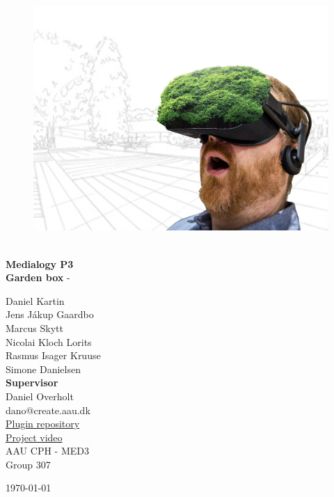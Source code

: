 \begin{titlepage}
			
\addtolength{\voffset}{2cm}

\begin{figure}[H]
\centering
\vspace{2cm}	%
\includegraphics[width=0.99\linewidth]{figure/Frontpage/gardenposterCropped.png}
\end{figure}

\mbox{}
\vfill
\renewcommand{\familydefault}{\sfdefault} \normalfont %
\HRule\\[0.1cm]
\textbf{{\small Medialogy P3\\ {\Huge Garden box}}} \hspace{0.15cm} {\Huge \color{gray}-} \\
\HRule\smallskip{}
\begin{multicols}{2}
{\Large Daniel Kartin\\Jens Jákup Gaardbo\\Marcus Skytt\\Nicolai Kloch Lorits\\Rasmus Isager Kruuse\\Simone Danielsen\columnbreak}\\
\setlength{\parskip}{2.4cm}
{\Large{\textbf{Supervisor}\\Daniel Overholt\\dano@create.aau.dk}}\medskip\\
\href{https://github.com/CakeFTW/unityOpencvPlugin}{\color{blue}Plugin repository}\\
\href{https://youtu.be/wmZ-fhU4JIE}{\color{blue}Project video}\medskip
\\\small AAU CPH - 
MED3 \\
Group 307\\
\end{multicols}
\today
\renewcommand{\familydefault}{\rmdefault} \normalfont %
\end{titlepage}


